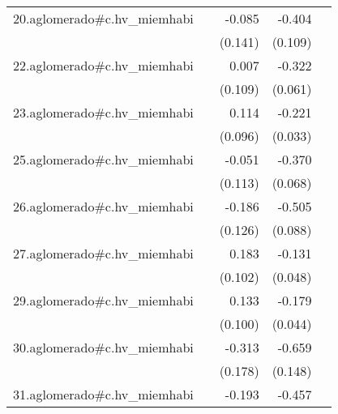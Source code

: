 {\begin{longtable}{l*{4}{D{.}{.}{-1}}}
\addlinespace
20.aglomerado#c.hv\_miemhabi&                     &      -0.085         &      -0.404\sym{***}&                     \\
            &                     &     (0.141)         &     (0.109)         &                     \\
\addlinespace
22.aglomerado#c.hv\_miemhabi&                     &       0.007         &      -0.322\sym{***}&                     \\
            &                     &     (0.109)         &     (0.061)         &                     \\
\addlinespace
23.aglomerado#c.hv\_miemhabi&                     &       0.114         &      -0.221\sym{***}&                     \\
            &                     &     (0.096)         &     (0.033)         &                     \\
\addlinespace
25.aglomerado#c.hv\_miemhabi&                     &      -0.051         &      -0.370\sym{***}&                     \\
            &                     &     (0.113)         &     (0.068)         &                     \\
\addlinespace
26.aglomerado#c.hv\_miemhabi&                     &      -0.186         &      -0.505\sym{***}&                     \\
            &                     &     (0.126)         &     (0.088)         &                     \\
\addlinespace
27.aglomerado#c.hv\_miemhabi&                     &       0.183         &      -0.131\sym{**} &                     \\
            &                     &     (0.102)         &     (0.048)         &                     \\
\addlinespace
29.aglomerado#c.hv\_miemhabi&                     &       0.133         &      -0.179\sym{***}&                     \\
            &                     &     (0.100)         &     (0.044)         &                     \\
\addlinespace
30.aglomerado#c.hv\_miemhabi&                     &      -0.313         &      -0.659\sym{***}&                     \\
            &                     &     (0.178)         &     (0.148)         &                     \\
\addlinespace
31.aglomerado#c.hv\_miemhabi&                     &      -0.193         &      -0.457\sym{***}&                     \\

\end{longtable}}
